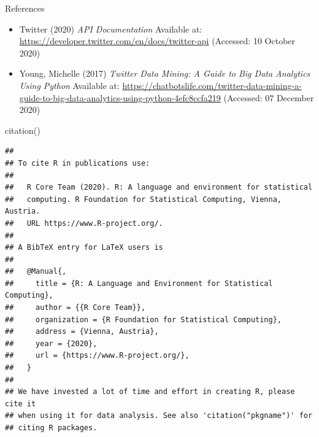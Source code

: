 \documentclass[
  ignorenonframetext,
]{beamer}
\newenvironment{Shaded}{\begin{snugshade}}{\end{snugshade}}
\newcommand{\FunctionTok}[1]{\textcolor[rgb]{0.00,0.00,0.00}{#1}}
\newcommand{\NormalTok}[1]{#1}
\begin{document}
\begin{frame}[fragile]{References}
\protect\hypertarget{references-1}{}
\begin{itemize}
\item
  Twitter (2020) \emph{API Documentation} Available at:
  \url{https://developer.twitter.com/en/docs/twitter-api} (Accessed: 10
  October 2020)
\item
  Young, Michelle (2017) \emph{Twitter Data Mining: A Guide to Big Data
  Analytics Using Python} Available at:
  \url{https://chatbotslife.com/twitter-data-mining-a-guide-to-big-data-analytics-using-python-4efc8ccfa219}
  (Accessed: 07 December 2020)
\end{itemize}

\begin{Shaded}
\begin{Highlighting}[]
\FunctionTok{citation}\NormalTok{()}
\end{Highlighting}
\end{Shaded}

\begin{verbatim}
## 
## To cite R in publications use:
## 
##   R Core Team (2020). R: A language and environment for statistical
##   computing. R Foundation for Statistical Computing, Vienna, Austria.
##   URL https://www.R-project.org/.
## 
## A BibTeX entry for LaTeX users is
## 
##   @Manual{,
##     title = {R: A Language and Environment for Statistical Computing},
##     author = {{R Core Team}},
##     organization = {R Foundation for Statistical Computing},
##     address = {Vienna, Austria},
##     year = {2020},
##     url = {https://www.R-project.org/},
##   }
## 
## We have invested a lot of time and effort in creating R, please cite it
## when using it for data analysis. See also 'citation("pkgname")' for
## citing R packages.
\end{verbatim}
\end{frame}
\end{document}
